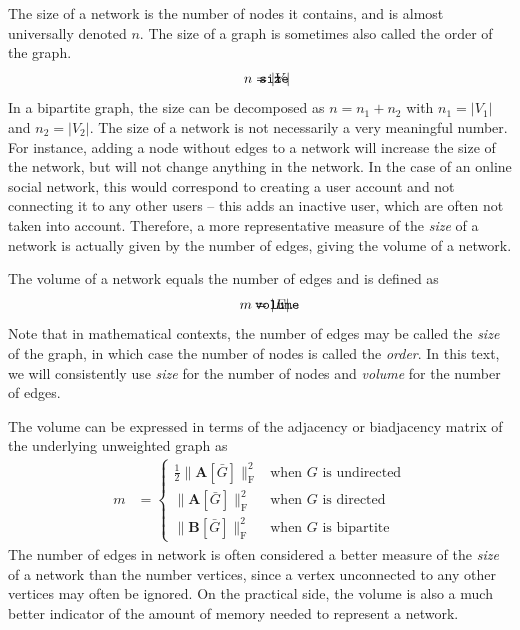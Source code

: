 \documentclass{article}
\def\mathnote#1{%
  \tag*{\rlap{\hspace\marginparsep\smash{\parbox[t]{\marginparwidth}{#1}}}}
}
\begin{document}
The size of a network is the number of nodes it contains, and
is almost universally denoted $n$.  The size of a graph is sometimes also
called the order of the graph. 
\begin{align}
  \mathnote{\texttt{size}}
  n &= |V|
\end{align}
In a bipartite graph, the size can be decomposed as $n = n_1 + n_2$ with
$n_1 = |V_1|$ and $n_2=|V_2|$.  The size of a network is not necessarily
a very meaningful number.  For instance, adding a node without edges to
a network will increase the size of the network, but will not change
anything in the network. In the case of an online social
network, this would correspond to creating a user account and not
connecting it to any other users -- this adds an inactive user, which
are often not taken into account.  Therefore, a more representative
measure of the \emph{size} of a network is actually given by the number
of edges, giving the volume of a network.

The volume of a network equals the number of edges and is defined as 
\begin{align}
  \mathnote{\texttt{volume}}
  m &= |E|. 
\end{align}
Note that in mathematical contexts, the number of edges may be called
the \emph{size} of the graph, in which case the number of nodes is
called the \emph{order}.  In this text, we will consistently use
\emph{size} for the number of nodes and \emph{volume} for the number of
edges. 

The volume can be expressed in terms of
the adjacency or biadjacency matrix of the underlying unweighted graph as
\begin{align}
  m &= \left\{ \begin{array}{ll}
    \frac 1 2 \| \mathbf A[\bar G] \|_{\mathrm F} ^2 &
    \text{when $G$ is undirected} \\
    \| \mathbf A[\bar G] \| _{\mathrm F} ^2 &
    \text{when $G$ is directed} \\
    \| \mathbf B[\bar G] \| _{\mathrm F} ^2 &    
    \text{when $G$ is bipartite}
    \end{array} \right.
\end{align}
The number of edges in network is often considered a better measure of
the \emph{size} of a network than the number vertices, since a vertex
unconnected to any other vertices may often be ignored.  On the
practical side, the volume is also a much better indicator of the amount
of memory needed to represent a network.
\end{document}
